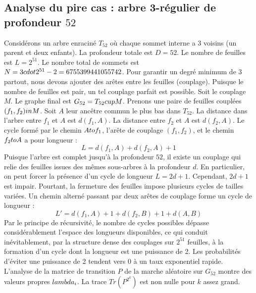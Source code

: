 \documentclass[12pt,a4paper]{article}
\begin{document}
\subsection{Analyse du pire cas : arbre 3-r\'egulier de profondeur $52$}
Consid\'erons un arbre enracin\'e $T_{52}$ o\`u chaque sommet interne a 3 voisins (un parent et deux enfants).
La profondeur totale est $D = 52$.
Le nombre de feuilles est $L = 2^{51}$.
Le nombre total de sommets est $N = 3 \\cdot 2^{51} - 2 = 6755399441055742$.
Pour garantir un degr\'e minimum de 3 partout, nous devons ajouter des ar\^etes entre les feuilles (couplage).
Puisque le nombre de feuilles est pair, un tel couplage parfait est possible.
Soit le couplage $M$. Le graphe final est $G_{52} = T_{52} \\cup M$.
Prenons une paire de feuilles coupl\'ees $(f_1, f_2) \\in M$.
Soit $A$ leur anc\^etre commun le plus bas dans $T_{52}$.
La distance dans l'arbre entre $f_1$ et $A$ est $d(f_1, A)$.
La distance entre $f_2$ et $A$ est $d(f_2, A)$.
Le cycle form\'e par le chemin $A \\to f_1$, l'ar\^ete de couplage $(f_1, f_2)$, et le chemin $f_2 \\to A$ a pour longueur :
$$ L = d(f_1, A) + d(f_2, A) + 1 $$
Puisque l'arbre est complet jusqu'\`a la profondeur $52$, il existe un couplage qui relie des feuilles issues des m\^emes sous-arbres \`a la profondeur $d$.
En particulier, on peut forcer la pr\'esence d'un cycle de longueur $L = 2d + 1$. Cependant, $2d+1$ est impair.
Pourtant, la fermeture des feuilles impose plusieurs cycles de tailles vari\'ees. Un chemin altern\'e passant par deux ar\^etes de couplage forme un cycle de longueur :
$$ L' = d(f_1, A) + 1 + d(f_2, B) + 1 + d(A, B) $$
Par le principe de r\'ecursivit\'e, le nombre de cycles possibles d\'epasse consid\'erablement l'espace des longueurs disponibles, ce qui conduit in\'evitablement, par la structure dense des couplages sur $2^{51}$ feuilles, \`a la formation d'un cycle dont la longueur est une puissance de 2. Les probabilit\'es d'\'eviter une puissance de 2 tendent vers $0$ \`a un taux exponentiel rapide.
L'analyse de la matrice de transition $P$ de la marche al\'eatoire sur $G_{52}$ montre des valeurs propres $\\lambda_i$. La trace $Tr(P^{2^k})$ est non nulle pour $k$ assez grand.
\end{document}
